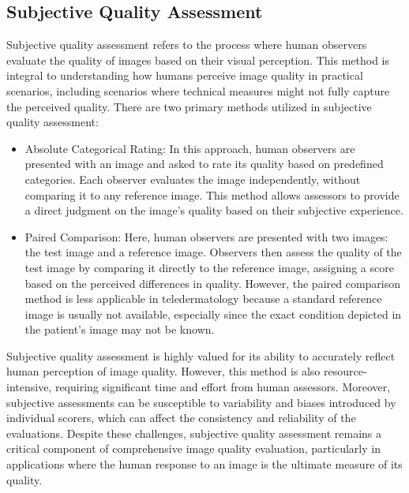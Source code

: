 \subsection{Subjective Quality Assessment}
\label{sub:SubjectiveQualityAssessment}
Subjective quality assessment refers to the process where human observers evaluate the quality of images based on their visual perception. This method is integral to understanding how humans perceive image quality in practical scenarios, including scenarios where technical measures might not fully capture the perceived quality. There are two primary methods utilized in subjective quality assessment:\par
\begin{itemize}
    \item Absolute Categorical Rating:  In this approach, human observers are presented with an image and asked to rate its quality based on predefined categories. Each observer evaluates the image independently, without comparing it to any reference image. This method allows assessors to provide a direct judgment on the image's quality based on their subjective experience.
    \item Paired Comparison: Here, human observers are presented with two images: the test image and a reference image. Observers then assess the quality of the test image by comparing it directly to the reference image, assigning a score based on the perceived differences in quality. However, the paired comparison method is less applicable in teledermatology because a standard reference image is usually not available, especially since the exact condition depicted in the patient's image may not be known.
\end{itemize}
Subjective quality assessment is highly valued for its ability to accurately reflect human perception of image quality. However, this method is also resource-intensive, requiring significant time and effort from human assessors. Moreover, subjective assessments can be susceptible to variability and biases introduced by individual scorers, which can affect the consistency and reliability of the evaluations. Despite these challenges, subjective quality assessment remains a critical component of comprehensive image quality evaluation, particularly in applications where the human response to an image is the ultimate measure of its quality.\par


